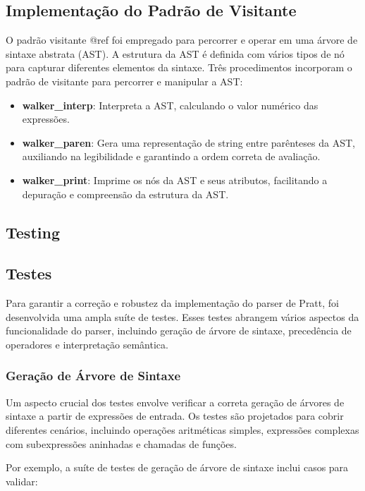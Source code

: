 \documentclass[english, 
               brazil, 
               bsc] %
               {dcomp-abntex2}
\begin{document}
\subsection{Implementação do Padrão de Visitante}

O padrão visitante @ref foi empregado para percorrer e operar em uma árvore de sintaxe abstrata (AST). A estrutura da AST é definida com vários tipos de nó para capturar diferentes elementos da sintaxe.
Três procedimentos incorporam o padrão de visitante para percorrer e manipular a AST:

\begin{itemize}
  \item \textbf{walker\_interp}: Interpreta a AST, calculando o valor numérico das expressões.
  \item \textbf{walker\_paren}: Gera uma representação de string entre parênteses da AST, auxiliando na legibilidade e garantindo a ordem correta de avaliação.
  \item \textbf{walker\_print}: Imprime os nós da AST e seus atributos, facilitando a depuração e compreensão da estrutura da AST.
\end{itemize}

\subsection{Testing}
\subsection{Testes}

Para garantir a correção e robustez da implementação do parser de Pratt, foi desenvolvida uma ampla suíte de testes. Esses testes abrangem vários aspectos da funcionalidade do parser, incluindo geração de árvore de sintaxe, precedência de operadores e interpretação semântica.

\subsubsection{Geração de Árvore de Sintaxe}

Um aspecto crucial dos testes envolve verificar a correta geração de árvores de sintaxe a partir de expressões de entrada. Os testes são projetados para cobrir diferentes cenários, incluindo operações aritméticas simples, expressões complexas com subexpressões aninhadas e chamadas de funções.

Por exemplo, a suíte de testes de geração de árvore de sintaxe inclui casos para validar:
\end{document}
